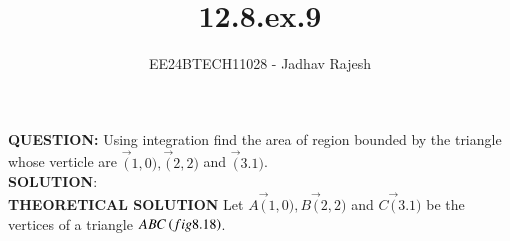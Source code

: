 \documentclass[journal]{IEEEtran}
\begin{document}

\vspace{3cm}
\title{12.8.ex.9}
\author{EE24BTECH11028 - Jadhav Rajesh}
{\let\newpage\relax\maketitle}

\renewcommand{\thefigure}{\theenumi}
\renewcommand{\thetable}{\theenumi}
\setlength{\intextsep}{10pt} %


\renewcommand{\thetable}{\theenumi}
 \textbf{QUESTION:} Using integration find the area of region bounded by the triangle whose verticle are $\vec(1,0),\vec(2,2)$ and $\vec(3.1)$.\\

 \textbf{SOLUTION}: \\
 \textbf{THEORETICAL SOLUTION}
 Let $A\vec(1,0),B\vec(2,2)$ and $C\vec(3.1)$ be the vertices of a triangle $ABC\left(fig 8.18\right)$.\\
\end{document}

